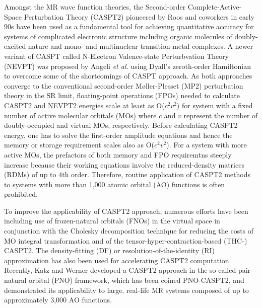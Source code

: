 \documentclass[aip,jcp,amsmath]{revtex4-1}
\begin{document}
%
%
%
Amongst the MR wave function theories, the Second-order Complete-Active-Space Perturbation Theory (CASPT2) pioneered by Roos and coworkers\cite{doi:10.1021/j100377a012,doi:10.1063/1.462209} in early 90s have been used as a fundamental tool for achieving quantitative accuracy for systems of complicated electronic structure including organic molecules of doubly-excited nature\cite{doi:10.1063/1.2889385} and mono-\cite{doi:10.1021/ct900567c,doi:10.1021/acs.jctc.9b00166} and multinuclear\cite{Cramer2008,doi:10.1002/chem.201902766} transition metal complexes.
%
A newer variant of CASPT called N-Electron Valence-state Perturbvation Theory (NEVPT) was proposed by Angeli {\it et al.}\cite{angeliintroduction2001,angelin-electron2002,angelinew2006} using Dyall's zeroth-order Hamiltonian\cite{dyallthe1995} to overcome some of the shortcomings of CASPT approach.
%
As both approaches converge to the conventional second-order M\o ller-Plesset (MP2) perturbation theory\cite{MP2} in the SR limit, floating-point operations (FPOs) needed to calculate CASPT2 and NEVPT2 energies scale at least as O($c^2v^2$) for system with a fixed number of active molecular orbitals (MOs) where $c$ and $v$ represent the number of doubly-occupied and virtual MOs, respectively.
%
Before calculating CASPT2 energy, one has to solve the first-order amplitude equations and hence the memory or storage requirement scales also as O($c^2v^2$).
%
For a system with more active MOs, the prefactors of both memory and FPO requiremtns steeply increase because their working equations involve the reduced-density matrices (RDMs) of up to 4th order.
%
Therefore, routine application of CASPT2 methods to systems with more than 1,000 atomic orbital (AO) functions is often prohibited.

%
To improve the applicability of CASPT2 approach, numerous efforts have been including use of frozen-natural orbitals (FNOs)\cite{doi:10.1063/1.3157463,doi:10.1021/acs.jctc.5b00479} in the virtual space in conjunction with the Cholesky decomposition technique for reducing the costs of MO integral transformation\cite{doi:10.1063/1.2953696,doi:10.1021/ct9000284,doi:10.1021/ct700263h,doi:10.1021/ct900612k} and of the tensor-hyper-contraction-based (THC-) CASPT2.\cite{doi:10.1063/1.5037283}
%
The density-fitting (DF) or resolution-of-the-identity (RI) approximation has also been used for accelerating CASPT2 computation.\cite{ShioWerner2013}
%
Recently, Katz and Werner developed a CASPT2 approach in the so-called pair-natural orbital (PNO) framework, which has been coined PNO-CASPT2, and demonstrated its applicability to large, real-life MR systems composed of up to approximately 3,000 AO functions.\cite{:/content/aip/journal/jcp/145/12/10.1063/1.4963019,doi:10.1063/1.5097644}
\end{document}
